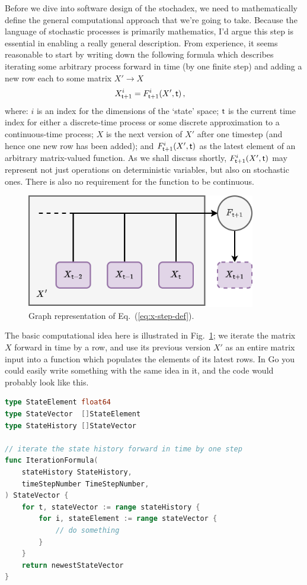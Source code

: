 \documentclass{book}
\begin{document}
Before we dive into software design of the stochadex, we need to mathematically define the general computational approach that we're going to take. Because the language of stochastic processes is primarily mathematics, I'd argue this step is essential in enabling a really general description. From experience, it seems reasonable to start by writing down the following formula which describes iterating some arbitrary process forward in time (by one finite step) and adding a new row each to some matrix $X' \rightarrow X$
\begin{align}
X^{i}_{{\sf t}+1} &= F^{i}_{{\sf t}+1}(X',{\sf t}) \,, \label{eq:x-step-def}
\end{align}
where: $i$ is an index for the dimensions of the `state' space; ${\sf t}$ is the current time index for either a discrete-time process or some discrete approximation to a continuous-time process; $X$ is the next version of $X'$ after one timestep (and hence one new row has been added); and $F^i_{{\sf t}+1}(X',{\sf t})$ as the latest element of an arbitrary matrix-valued function. As we shall discuss shortly, $F^i_{{\sf t}+1}(X',{\sf t})$ may represent not just operations on deterministic variables, but also on stochastic ones. There is also no requirement for the function to be continuous.

\begin{figure}[h]
\centering
\includegraphics[width=10cm]{images/fundamental-loop.drawio.png}
\caption{Graph representation of Eq.~(\ref{eq:x-step-def}).}
\label{fig:fundamental-loop}
\end{figure}

The basic computational idea here is illustrated in Fig.~\ref{fig:fundamental-loop}; we iterate the matrix $X$ forward in time by a row, and use its previous version $X'$ as an entire matrix input into a function which populates the elements of its latest rows. In Go you could easily write something with the same idea in it, and the code would probably look like this.

\begin{lstlisting}[language=Go]
type StateElement float64
type StateVector  []StateElement
type StateHistory []StateVector

// iterate the state history forward in time by one step
func IterationFormula(
    stateHistory StateHistory, 
    timeStepNumber TimeStepNumber,
) StateVector {
    for t, stateVector := range stateHistory {
        for i, stateElement := range stateVector {
            // do something
        }
    }
    return newestStateVector
}
\end{lstlisting}
\end{document}
